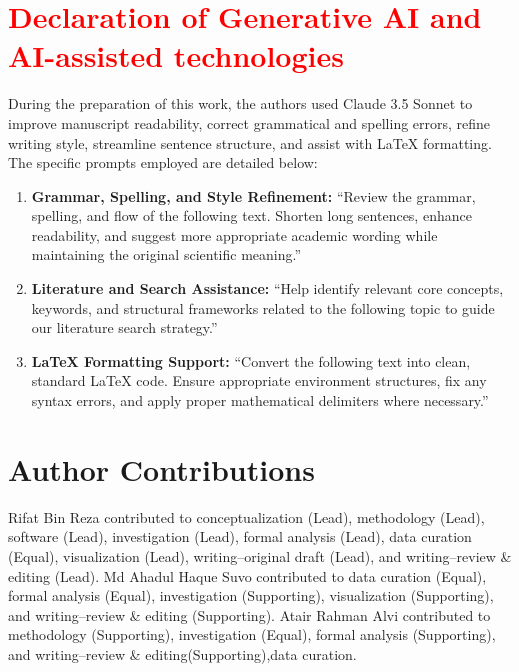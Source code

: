 \documentclass{elektr}
\begin{document}
\section*{\textcolor{red}{Declaration of Generative AI and AI-assisted technologies}}

During the preparation of this work, the authors used Claude 3.5 Sonnet to improve manuscript readability, correct grammatical and spelling errors, refine writing style, streamline sentence structure, and assist with LaTeX formatting. The specific prompts employed are detailed below:

\begin{enumerate}
    \item \textbf{Grammar, Spelling, and Style Refinement:} ``Review the grammar, spelling, and flow of the following text. Shorten long sentences, enhance readability, and suggest more appropriate academic wording while maintaining the original scientific meaning.''
    \item \textbf{Literature and Search Assistance:} ``Help identify relevant core concepts, keywords, and structural frameworks related to the following topic to guide our literature search strategy.''
    \item \textbf{LaTeX Formatting Support:} ``Convert the following text into clean, standard LaTeX code. Ensure appropriate environment structures, fix any syntax errors, and apply proper mathematical delimiters where necessary.''
\end{enumerate}

\section{Author Contributions}

Rifat Bin Reza contributed to conceptualization (Lead), methodology (Lead),
software (Lead), investigation (Lead), formal analysis (Lead), data curation
(Equal), visualization (Lead), writing--original draft (Lead), and
writing--review \& editing (Lead). Md Ahadul Haque Suvo contributed to data
curation (Equal), formal analysis (Equal), investigation (Supporting),
visualization (Supporting), and writing--review \& editing (Supporting).
Atair Rahman Alvi contributed to methodology (Supporting), investigation
(Equal), formal analysis (Supporting), and writing--review \& editing(Supporting),data curation.
\end{document}
